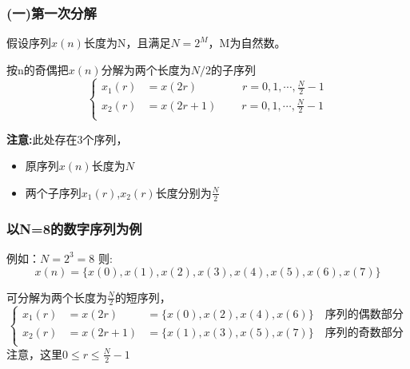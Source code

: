 \documentclass[notheorems,compress,mathserif,table]{beamer}
\begin{document}
\begin{frame}[shrink]\frametitle{(一)第一次分解}
假设序列$x(n)$长度为N，且满足$N=2^{M}$，M为自然数。\par
按n的奇偶把$x(n)$分解为两个长度为$N/2$的子序列%
\begin{equation*}
\left\{ \begin{aligned}
    x_{1}(r) &= x(2r)\quad\quad\qquad r=0,1,\cdots,\frac{N}{2}-1 \\
    x_{2}(r) &= x(2r+1)\quad\:\quad r=0,1,\cdots,\frac{N}{2}-1 \\
\end{aligned} \right.
\end{equation*}


\textbf{注意:}\qquad  此处存在3个序列，
\begin{itemize}
  \item   原序列$x(n)$长度为$N$
   \item  两个子序列$x_{1}(r)$,$x_{2}(r)$长度分别为$\frac{N}{2}$
\end{itemize}
\end{frame}
\begin{frame}[shrink]\frametitle{以N=8的数字序列为例 }

%


例如：$N = 2^{3} =8 $ 则:
 $$x(n) = \{x(0),x(1),x(2),x(3),x(4),x(5),x(6),x(7)\}$$

可分解为两个长度为$\frac{N}{2}$的短序列，
\begin{equation*} \label{eq:2}
\left\{ \begin{aligned}
    x_{1}(r) &=x(2r)   &= \{x(0),x(2),x(4),x(6)\} \quad\mbox{序列的偶数部分}\\
    x_{2}(r) &=x(2r+1) &= \{x(1),x(3),x(5),x(7)\} \quad\mbox{序列的奇数部分}\\
\end{aligned} \right.
\end{equation*}
注意，这里\textbf{$0\leq r\leq\frac{N}{2}-1$}
\end{frame}
\end{document}
